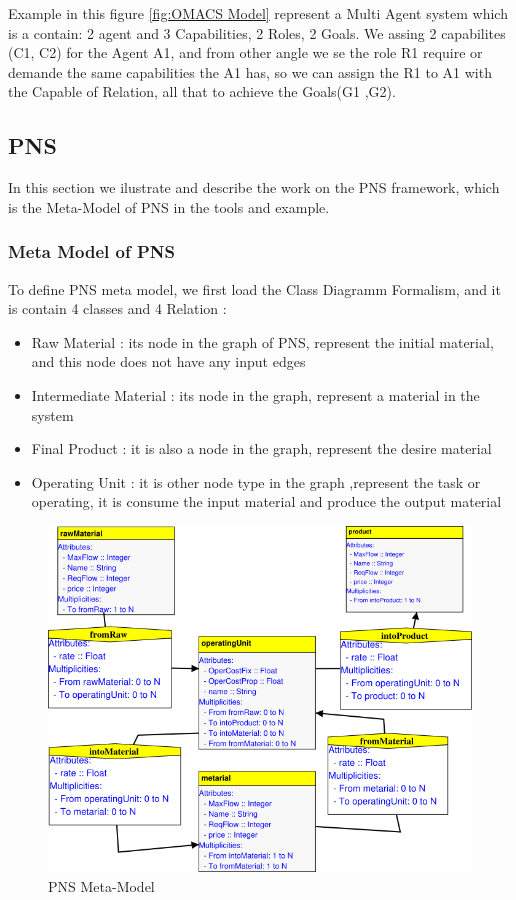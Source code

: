 Example in this figure \ref{fig:OMACS Model} represent a Multi Agent system which is a contain: 2 agent and 3 Capabilities, 2 Roles, 2 Goals.
We assing 2 capabilites (C1, C2) for the Agent A1, and from other angle we se the role R1 require or demande the same capabilities the A1 has, so we can assign the R1 to A1 with the Capable of Relation, all that to achieve the Goals(G1 ,G2). 

\subsection{PNS} 

In this section we ilustrate and describe the work on the PNS framework, which is the Meta-Model of PNS in the tools and example. 
\subsubsection{Meta Model of PNS}
To define PNS meta model, we first load the Class Diagramm Formalism, and it is contain 4 classes and 4 Relation : 
\begin{itemize}

\newcommand{\localtextbulletone}{\textcolor{gray}{\raisebox{.45ex}{\rule{.6ex}{.6ex}}}}
\renewcommand{\labelitemi}{\localtextbulletone}
	\item Raw Material : its node in the graph of PNS, represent the initial material, and this node does not have any input edges 
	\item Intermediate Material : its node in the graph, represent a material in the system
	\item Final Product : it is also a node in the graph, represent the desire material 
	\item Operating Unit : it is other node type in the graph ,represent the task or operating, it is consume the input material and produce the output material 
\end{itemize}
\pagebreak
\begin{figure}[th] 

	\centering
 	\includegraphics[scale=0.7]{ch3/img/pns_meta}
	\caption{\label{fig:PNS Meta-Model}PNS Meta-Model}
	
\end{figure} 

